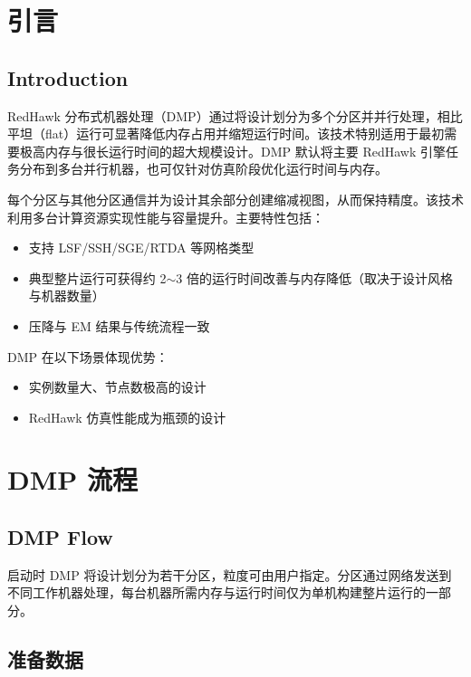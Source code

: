 ﻿%
\label{chap:dmp}

\section{引言}
\subsection*{Introduction}

RedHawk 分布式机器处理（DMP）通过将设计划分为多个分区并并行处理，相比平坦（flat）运行可显著降低内存占用并缩短运行时间。该技术特别适用于最初需要极高内存与很长运行时间的超大规模设计。DMP 默认将主要 RedHawk 引擎任务分布到多台并行机器，也可仅针对仿真阶段优化运行时间与内存。

每个分区与其他分区通信并为设计其余部分创建缩减视图，从而保持精度。该技术利用多台计算资源实现性能与容量提升。主要特性包括：
\begin{itemize}
  \item 支持 LSF/SSH/SGE/RTDA 等网格类型
  \item 典型整片运行可获得约 2$\sim$3 倍的运行时间改善与内存降低（取决于设计风格与机器数量）
  \item 压降与 EM 结果与传统流程一致
\end{itemize}

DMP 在以下场景体现优势：
\begin{itemize}
  \item 实例数量大、节点数极高的设计
  \item RedHawk 仿真性能成为瓶颈的设计
\end{itemize}


\section{DMP 流程}
\subsection*{DMP Flow}

启动时 DMP 将设计划分为若干分区，粒度可由用户指定。分区通过网络发送到不同工作机器处理，每台机器所需内存与运行时间仅为单机构建整片运行的一部分。

\subsection{准备数据}
